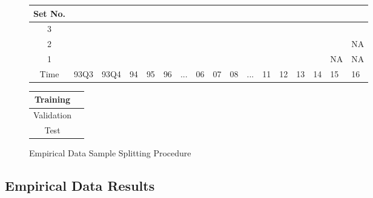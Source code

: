 \documentclass[11pt, a4paper, table]{article}
\begin{document}
\begin{figure}[!htb]
	\begin{center}
		\begin{tabular}{|c|p{0.55cm}p{0.55cm}p{0.50cm}p{0.50cm}p{0.50cm}p{0.50cm}p{0.50cm}p{0.50cm}p{0.50cm}p{0.50cm}p{0.50cm}p{0.50cm}p{0.50cm}p{0.50cm}p{0.50cm}p{0.50cm}|}
			\hline
			Set No. &&&&&&&&&&&&&&&& \\
			\hline
			3 & \cellcolor{cyan} & \cellcolor{cyan} & \cellcolor{cyan} & \cellcolor{cyan} & \cellcolor{cyan} & \cellcolor{cyan} & \cellcolor{cyan} & \cellcolor{cyan} &
			\cellcolor{pink} & \cellcolor{pink} & \cellcolor{pink} & \cellcolor{pink} & \cellcolor{pink} & \cellcolor{pink} & \cellcolor{pink} & \cellcolor{olive} \\
			2 & \cellcolor{cyan} & \cellcolor{cyan} & \cellcolor{cyan} & \cellcolor{cyan} & \cellcolor{cyan} & \cellcolor{cyan} & \cellcolor{cyan} &
			\cellcolor{pink} & \cellcolor{pink} & \cellcolor{pink} & \cellcolor{pink} & \cellcolor{pink} & \cellcolor{pink} & \cellcolor{pink} & 	
			\cellcolor{olive} & NA \\
			1 & \cellcolor{cyan} & \cellcolor{cyan} & \cellcolor{cyan} & \cellcolor{cyan} & \cellcolor{cyan} & \cellcolor{cyan} &
			\cellcolor{pink} & \cellcolor{pink} & \cellcolor{pink} & \cellcolor{pink} & \cellcolor{pink} & \cellcolor{pink} & \cellcolor{pink} & \cellcolor{olive} & NA & NA \\
			\hline
			Time & 93Q3 & 93Q4 & 94 & 95 & 96 & ... & 06 & 07 & 08 & ... & 11 & 12 & 13 & 14 & 15 & 16 \\
			\hline
		\end{tabular}
		\medskip
		\begin{tabular}{|c|p{0.60cm}|}
			\hline
			Training & \cellcolor{cyan} \\
			\hline
			Validation & \cellcolor{pink} \\
			\hline
			Test & \cellcolor{olive} \\
			\hline
		\end{tabular}
	\end{center}
	\caption{Empirical Data Sample Splitting Procedure}
	\label{emp_sample_split_diag}
\end{figure}

\subsection{Empirical Data Results}

\end{document}
